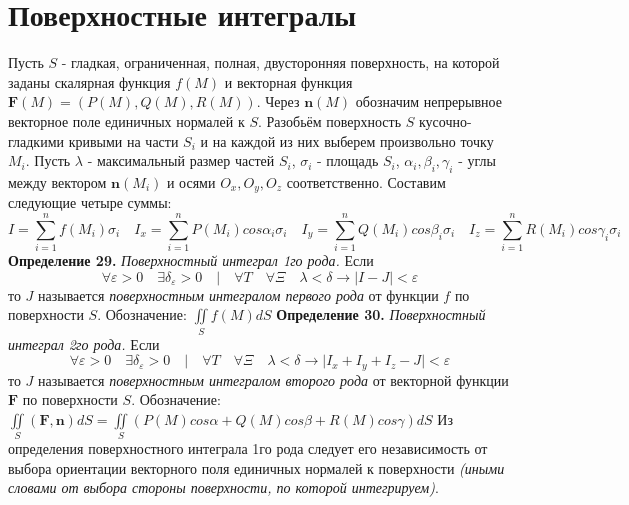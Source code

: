 \documentclass[12pt,a4paper]{article}
\begin{document}
	\section{Поверхностные интегралы}
	Пусть $S$ - гладкая, ограниченная, полная, двусторонняя поверхность, на которой заданы скалярная функция $f(M)$ и векторная функция $\textbf{F}(M) = (P(M), Q(M), R(M))$. Через $\textbf{n}(M)$ обозначим непрерывное векторное поле единичных нормалей к $S$.
	\newline
	Разобьём поверхность $S$ кусочно-гладкими кривыми на части $S_{i}$ и на каждой из них выберем произвольно точку $M_{i}$. Пусть $\lambda$ - максимальный размер частей $S_{i}$, $\sigma_{i}$ - площадь $S_{i}$, $\alpha_{i}, \beta_{i}, \gamma_{i}$ - углы между вектором $\textbf{n}(M_{i})$ и осями $O_{x}, O_{y}, O_{z}$ соответственно.
	\newline
	Составим следующие четыре суммы:
	\begin{equation}
		I = \sum\limits_{i=1}^n f(M_{i})\sigma_{i} \quad
		I_{x} = \sum\limits_{i=1}^n P(M_{i})cos\alpha_{i}\sigma_{i} \quad
		I_{y} = \sum\limits_{i=1}^n Q(M_{i})cos\beta_{i}\sigma_{i} \quad
		I_{z} = \sum\limits_{i=1}^n R(M_{i})cos\gamma_{i}\sigma_{i} \quad
	\end{equation}
	\textbf{Определение 29.} \textit{Поверхностный интеграл 1го рода.}
	\newline
	Если \[\forall \varepsilon > 0 \quad \exists \delta_{\varepsilon} > 0 \quad|\quad \forall T \quad\forall \Xi \quad\lambda < \delta \rightarrow |I - J| < \varepsilon \]
	то $J$ называется \textit{поверхностным интегралом первого рода} от функции $f$ по поверхности $S$. 
	\newline
	Обозначение: $\iint\limits_{S} f(M)dS$
	\newline
	\textbf{Определение 30.} \textit{Поверхностный интеграл 2го рода.}
	\newline
	Если \[\forall \varepsilon > 0 \quad \exists \delta_{\varepsilon} > 0 \quad|\quad \forall T \quad\forall \Xi \quad\lambda < \delta \rightarrow |I_{x} + I_{y} + I_{z} - J| < \varepsilon \]
	то $J$ называется \textit{поверхностным интегралом второго рода} от векторной функции $\textbf{F}$ по поверхности $S$. 
	\newline
	Обозначение: $\iint\limits_{S} (\textbf{F}, \textbf{n}) dS = \iint\limits_{S} (P(M)cos\alpha + Q(M)cos\beta + R(M)cos\gamma) dS$
	\newline
	\newline
	Из определения поверхностного интеграла 1го рода следует его независимость от выбора ориентации векторного поля единичных нормалей к поверхности \textit{(иными словами от выбора стороны поверхности, по которой интегрируем)}.
\end{document}
